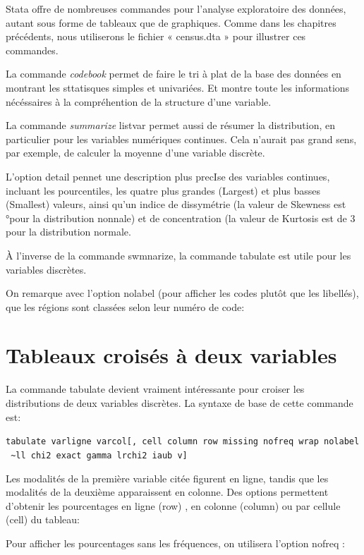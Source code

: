 \documentclass[
]{book}
\begin{document}
Stata offre de nombreuses commandes pour l'analyse
exploratoire des données, autant sous forme de tableaux que de
graphiques. Comme dans les chapitres précédents, nous
utiliserons le fichier « census.dta » pour illustrer ces
commandes.

La commande \emph{codebook} permet de faire le tri à plat de la base des données en montrant les sttatisques simples et univariées. Et montre toute les informations nécéssaires à la compréhention de la structure d'une variable.

La commande \emph{summarize} listvar permet aussi de résumer
la distribution, en particulier pour les variables numériques
continues. Cela n'aurait pas grand sens, par exemple, de calculer
la moyenne d'une variable discrète.

L'option detail pennet une description plus precIse des
variables continues, incluant les pourcentiles, les quatre plus
grandes (Largest) et plus basses (Smallest) valeurs, ainsi
qu'un indice de dissymétrie (la valeur de Skewness est °pour
la distribution nonnale) et de concentration (la valeur de
Kurtosis est de 3 pour la distribution normale.

À l'inverse de la commande swmnarize, la commande tabulate est utile pour les variables discrètes.

On remarque avec l'option nolabel (pour afficher les codes plutôt que les libellés), que les régions sont classées selon leur numéro de code:

\hypertarget{tableaux-croisuxe9s-uxe0-deux-variables}{%
\section{Tableaux croisés à deux variables}\label{tableaux-croisuxe9s-uxe0-deux-variables}}

La commande tabulate devient vraiment intéressante pour croiser les distributions de deux variables discrètes. La syntaxe de base de cette commande est:

\texttt{tabulate\ varligne\ varcol{[},\ cell\ column\ row\ missing\ nofreq\ wrap\ nolabel\ \textasciitilde{}ll\ chi2\ exact\ gamma\ lrchi2\ iaub\ v{]}}

Les modalités de la première variable citée figurent en ligne, tandis que les modalités de la deuxième apparaissent en colonne. Des options permettent d'obtenir les pourcentages en ligne (row) , en colonne (column) ou par cellule (cell) du tableau:

Pour afficher les pourcentages sans les fréquences, on utilisera l'option nofreq :
\end{document}

